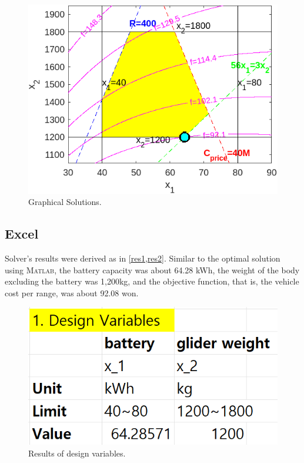 \documentclass[11pt,twocolumn]{article}
\begin{document}
                \begin{figure}[h]
                    \centering
                    \includegraphics[width=.9\columnwidth]{graphical.png}
                    \caption{Graphical Solutions.}
                    \label{graphical}
                \end{figure}

        \subsection{Excel}
            Solver's results were derived as in \cref{res1,res2}.
            Similar to the optimal solution using \textsc{Matlab}, the battery capacity was about 64.28 kWh, the weight of the body excluding the battery was 1,200kg, and the objective function, that is, the vehicle cost per range, was about 92.08 won.

            \begin{figure}[h]
                    \centering
                    \includegraphics[width=.8\columnwidth]{Excel55.png}
                    \caption{Results of design variables.}
                    \label{res1}
            \end{figure}
\end{document}
